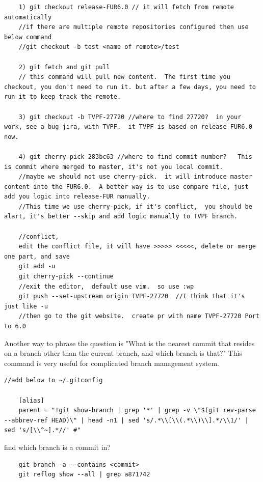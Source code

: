 \documentclass[paper=8.5in:11in, twoside, 12pt, pagesize=pdftex]{book}
\begin{document}
\begin{lstlisting}
	1) git checkout release-FUR6.0 // it will fetch from remote automatically
	//if there are multiple remote repositories configured then use below command
	//git checkout -b test <name of remote>/test
	
	2) git fetch and git pull 
	// this command will pull new content.  The first time you checkout, you don't need to run it. but after a few days, you need to run it to keep track the remote. 
	
	3) git checkout -b TVPF-27720 //where to find 27720?  in your work, see a bug jira, with TVPF.  it TVPF is based on release-FUR6.0 now.
	
	4) git cherry-pick 283bc63 //where to find commit number?   This is commit where merged to master, it's not you local commit.
	//maybe we should not use cherry-pick.  it will introduce master content into the FUR6.0.  A better way is to use compare file, just add you logic into release-FUR manually. 
	//This time we use cherry-pick, if it's conflict,  you should be alart, it's better --skip and add logic manually to TVPF branch.
	
	//conflict, 
	edit the conflict file, it will have >>>>> <<<<<, delete or merge one part, and save
	git add -u
	git cherry-pick --continue
	//exit the editor,  default use vim.  so use :wp 
	git push --set-upstream origin TVPF-27720  //I think that it's just like -u
	//then go to the git website.  create pr with name TVPF-27720 Port to 6.0	
\end{lstlisting}


Another way to phrase the question is "What is the nearest commit that resides on a branch other than the current branch, and which branch is that?" This command is very useful for complicated branch management system. 

\begin{lstlisting}[mathescape = false] 
	//add below to ~/.gitconfig	
	
	[alias]
	parent = "!git show-branch | grep '*' | grep -v \"$(git rev-parse --abbrev-ref HEAD)\" | head -n1 | sed 's/.*\\[\\(.*\\)\\].*/\\1/' | sed 's/[\\^~].*//' #"
\end{lstlisting}

find which branch is a commit in? 
\begin{lstlisting}
	git branch -a --contains <commit>
	git reflog show --all | grep a871742
\end{lstlisting}	
\end{document}
